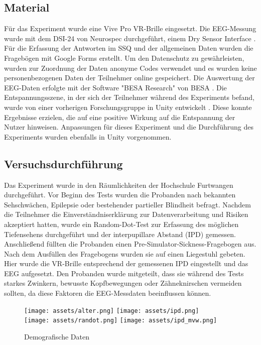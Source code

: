 \documentclass[conference]{IEEEtran}
\begin{document}
\subsection{Material}
Für das Experiment wurde eine Vive Pro VR-Brille \cite{b8} eingesetzt. Die EEG-Messung wurde mit dem DSI-24 von Neurospec durchgeführt, einem Dry Sensor Interface \cite{b9}. Für die Erfassung der Antworten im SSQ und der allgemeinen Daten wurden die Fragebögen mit Google Forms erstellt. Um den Datenschutz zu gewährleisten, wurden zur Zuordnung der Daten anonyme Codes verwendet und es wurden keine personenbezogenen Daten der Teilnehmer online gespeichert. Die Auswertung der EEG-Daten erfolgte mit der Software "BESA Research" von BESA \cite{b10}. Die Entspannungsszene, in der sich der Teilnehmer während des Experiments befand, wurde von einer vorherigen Forschungsgruppe in Unity entwickelt \cite{b11}. Diese konnte Ergebnisse erzielen, die auf eine positive Wirkung auf die Entspannung der Nutzer hinweisen. Anpassungen für dieses Experiment und die Durchführung des Experiments wurden ebenfalls in Unity vorgenommen.

\subsection{Versuchsdurchführung}
Das Experiment wurde in den Räumlichkeiten der Hochschule Furtwangen durchgeführt. Vor Beginn des Tests wurden die Probanden nach bekannten Sehschwächen, Epilepsie oder bestehender partieller Blindheit befragt. Nachdem die Teilnehmer die Einverständniserklärung zur Datenverarbeitung und Risiken akzeptiert hatten, wurde ein Random-Dot-Test zur Erfassung des möglichen Tiefensehens durchgeführt und der interpupillare Abstand (IPD) gemessen. Anschließend füllten die Probanden einen Pre-Simulator-Sickness-Fragebogen aus. Nach dem Ausfüllen des Fragebogens wurden sie auf einen Liegestuhl gebeten. Hier wurde die VR-Brille entsprechend der gemessenen IPD eingestellt und das EEG aufgesetzt. Den Probanden wurde mitgeteilt, dass sie während des Tests starkes Zwinkern, bewusste Kopfbewegungen oder Zähneknirschen vermeiden sollten, da diese Faktoren die EEG-Messdaten beeinflussen können.

\begin{figure}[ht]
	\centering
	\texttt{[image: assets/alter.png]} \hspace{-5pt}
	\texttt{[image: assets/ipd.png]} \\
	\vspace{2pt}
	\texttt{[image: assets/randot.png]} \hspace{-5pt}
	\texttt{[image: assets/ipd\_mvw.png]}\\
	\caption{Demografische Daten}
	\label{fig:Demografische Daten}
\end{figure}
\end{document}
